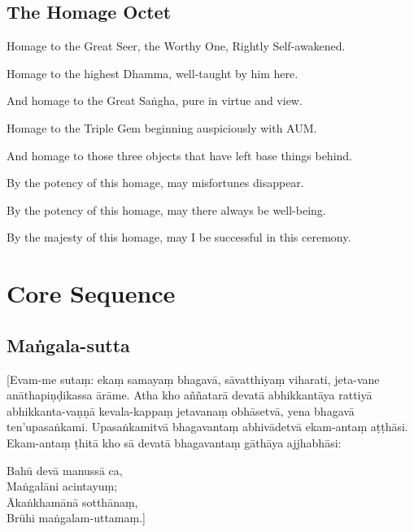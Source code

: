 \subsection{The Homage Octet}

Homage to the Great Seer, the Worthy One, Rightly Self-awakened.

Homage to the highest Dhamma, well-taught by him here.

And homage to the Great Saṅgha, pure in virtue and view.

Homage to the Triple Gem beginning auspiciously with AUM.

And homage to those three objects that have left base things behind.

By the potency of this homage, may misfortunes disappear.

By the potency of this homage, may there always be well-being.

By the majesty of this homage, may I be successful in this ceremony.

\section{Core Sequence}

\subsection{Maṅgala-sutta}
\label{asevana}


[Evam-me sutaṃ: ekaṃ samayaṃ bhagavā, sāvatthiyaṃ viharati, jeta-vane
anāthapiṇḍikassa ārāme. Atha kho aññatarā devatā abhikkantāya rattiyā
abhikkanta-vaṇṇā kevala-kappaṃ jetavanaṃ obhāsetvā, yena bhagavā ten'upasaṅkami.
Upasaṅkamitvā bhagavantaṃ abhivādetvā ekam-antaṃ aṭṭhāsi. Ekam-antaṃ ṭhitā kho
sā devatā bhagavantaṃ gāthāya ajjhabhāsi:

Bahū devā manussā ca,\\
Maṅgalāni acintayuṃ;\\
Ākaṅkhamānā sotthānaṃ,\\
Brūhi maṅgalam-uttamaṃ.]

\bigskip


